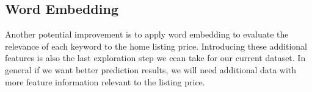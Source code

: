 \documentclass[twocolumn]{article}
\begin{document}
\subsection{Word Embedding}
Another potential improvement is to apply word embedding to evaluate the relevance of each keyword to the home listing price. Introducing these additional features is also the last exploration step we ccan take for our current dataset. In general if we want better prediction results, we will need additional data with more feature information relevant to the listing price.
\end{document}
